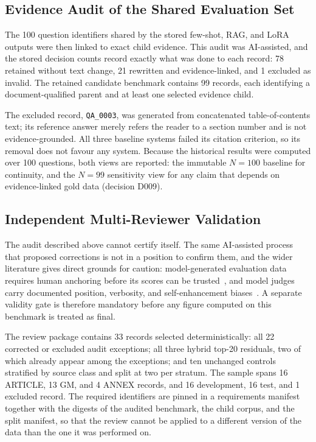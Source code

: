 \subsection{Evidence Audit of the Shared Evaluation Set}

The 100 question identifiers shared by the stored few-shot, \ac{RAG}, and \ac{LoRA} outputs were then linked to exact child evidence. This audit was \ac{AI}-assisted, and the stored decision counts record exactly what was done to each record: 78 retained without text change, 21 rewritten and evidence-linked, and 1 excluded as invalid. The retained candidate benchmark contains 99 records, each identifying a document-qualified parent and at least one selected evidence child.

The excluded record, \texttt{QA\_0003}, was generated from concatenated table-of-contents text; its reference answer merely refers the reader to a section number and is not evidence-grounded. All three baseline systems failed its citation criterion, so its removal does not favour any system. Because the historical results were computed over 100 questions, both views are reported: the immutable $N=100$ baseline for continuity, and the $N=99$ sensitivity view for any claim that depends on evidence-linked gold data (decision D009).

\subsection{Independent Multi-Reviewer Validation}
\label{sec:method-review}

The audit described above cannot certify itself. The same \ac{AI}-assisted process that proposed corrections is not in a position to confirm them, and the wider literature gives direct grounds for caution: model-generated evaluation data requires human anchoring before its scores can be trusted~\cite{saadfalcon2024ares}, and model judges carry documented position, verbosity, and self-enhancement biases~\cite{zheng2023judging}. A separate validity gate is therefore mandatory before any figure computed on this benchmark is treated as final.

The review package contains 33 records selected deterministically: all 22 corrected or excluded audit exceptions; all three hybrid top-20 residuals, two of which already appear among the exceptions; and ten unchanged controls stratified by source class and split at two per stratum. The sample spans 16 ARTICLE, 13 GM, and 4 ANNEX records, and 16 development, 16 test, and 1 excluded record. The required identifiers are pinned in a requirements manifest together with the digests of the audited benchmark, the child corpus, and the split manifest, so that the review cannot be applied to a different version of the data than the one it was performed on.

